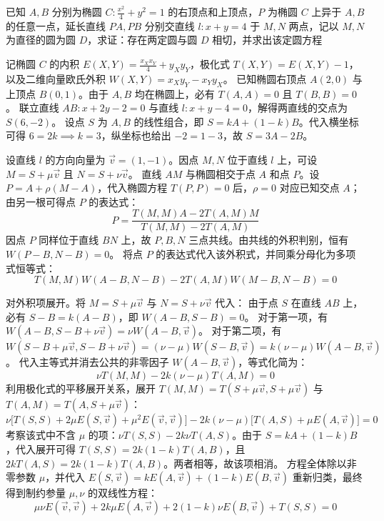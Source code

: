 \begin{exercise}
    已知 \(A, B\) 分别为椭圆 \(C: \frac{x^2}{4} + y^2 = 1\) 的右顶点和上顶点，\(P\) 为椭圆 \(C\) 上异于 \(A, B\) 的任意一点，延长直线 \(PA, PB\) 分别交直线 \(l: x + y = 4\) 于 \(M, N\) 两点，记以 \(M, N\) 为直径的圆为圆 \(D\)，求证：存在两定圆与圆 \(D\) 相切，并求出该定圆方程
\end{exercise}
\begin{solution}
记椭圆 $C$ 的内积 $E(X,Y) = \frac{x_X x_Y}{4} + y_X y_Y$，极化式 $T(X,Y) = E(X,Y) - 1$，以及二维向量欧氏外积 $W(X,Y) = x_X y_Y - x_Y y_X$。
已知椭圆右顶点 $A(2,0)$ 与上顶点 $B(0,1)$。由于 $A, B$ 均在椭圆上，必有 $T(A,A) = 0$ 且 $T(B,B) = 0$。
联立直线 $AB: x + 2y - 2 = 0$ 与直线 $l: x + y - 4 = 0$，解得两直线的交点为 $S(6,-2)$。
设点 $S$ 为 $A, B$ 的线性组合，即 $S = kA + (1-k)B$。代入横坐标可得 $6 = 2k \implies k=3$，纵坐标也给出 $-2 = 1 - 3$，故 $S = 3A - 2B$。

设直线 $l$ 的方向向量为 $\vec{v} = (1, -1)$。因点 $M, N$ 位于直线 $l$ 上，可设 $M = S + \mu \vec{v}$ 且 $N = S + \nu \vec{v}$。
直线 $AM$ 与椭圆相交于点 $A$ 和点 $P$。设 $P=A+\rho(M-A)$，代入椭圆方程 $T(P,P)=0$ 后，$\rho=0$ 对应已知交点 $A$；由另一根可得点 $P$ 的表达式：
$$ P = \frac{T(M,M)A - 2T(A,M)M}{T(M,M) - 2T(A,M)} $$
因点 $P$ 同样位于直线 $BN$ 上，故 $P, B, N$ 三点共线。由共线的外积判别，恒有 $W(P-B, N-B) = 0$。
将点 $P$ 的表达式代入该外积式，并同乘分母化为多项式恒等式：
$$ T(M,M) W(A-B, N-B) - 2T(A,M) W(M-B, N-B) = 0 $$

对外积项展开。将 $M = S + \mu \vec{v}$ 与 $N = S + \nu \vec{v}$ 代入：
由于点 $S$ 在直线 $AB$ 上，必有 $S-B = k(A-B)$，即 $W(A-B, S-B) = 0$。
对于第一项，有 $W(A-B, S-B + \nu \vec{v}) = \nu W(A-B, \vec{v})$。
对于第二项，有 $W(S-B + \mu \vec{v}, S-B + \nu \vec{v}) = (\nu - \mu) W(S-B, \vec{v}) = k(\nu - \mu) W(A-B, \vec{v})$。
代入主等式并消去公共的非零因子 $W(A-B, \vec{v})$，等式化简为：
$$ \nu T(M,M) - 2k(\nu - \mu) T(A,M) = 0 $$
利用极化式的平移展开关系，展开 $T(M,M) = T(S+\mu\vec{v}, S+\mu\vec{v})$ 与 $T(A,M) = T(A, S+\mu\vec{v})$：
$$ \nu \big[ T(S,S) + 2\mu E(S,\vec{v}) + \mu^2 E(\vec{v},\vec{v}) \big] - 2k(\nu - \mu) \big[ T(A,S) + \mu E(A,\vec{v}) \big] = 0 $$
考察该式中不含 $\mu$ 的项：$\nu T(S,S) - 2k\nu T(A,S)$。由于 $S = kA + (1-k)B$，代入展开可得 $T(S,S) = 2k(1-k)T(A,B)$，且 $2k T(A,S) = 2k(1-k)T(A,B)$。两者相等，故该项相消。
方程全体除以非零参数 $\mu$，并代入 $E(S,\vec{v}) = k E(A,\vec{v}) + (1-k) E(B,\vec{v})$ 重新归类，最终得到制约参量 $\mu, \nu$ 的双线性方程：
$$ \mu\nu E(\vec{v},\vec{v}) + 2k\mu E(A,\vec{v}) + 2(1-k)\nu E(B,\vec{v}) + T(S,S) = 0 $$


\end{solution}
